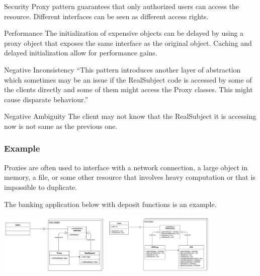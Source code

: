 \begin{nfps}
\item[Security] Proxy pattern guarantees that only authorized users can access
    the resource. Different interfaces can be seen as different access rights.
\item[Performance] The initialization of expensive objects can be delayed by
    using a proxy object that exposes the same interface as the original 
    object. Caching and delayed initialization allow for performance gains.
\item[Negative Inconsistency] ``This pattern introduces another layer of
    abstraction which sometimes may be an issue if the {\sc RealSubject} code
    is accessed by some of the clients directly and some of them might access
    the {\sc Proxy} classes. This might cause disparate behaviour.'' 
\item[Negative Ambiguity] The client may not know that the {\sc RealSubject} it
    is accessing now is not same as the previous one.
\end{nfps}

\subsubsection{Example}
Proxies are often used to interface with a network connection, a large object
in memory, a file, or some other resource that involves heavy computation or
that is impossible to duplicate.

The banking application below with deposit functions is an example.

\begin{center}
    \includegraphics[width=0.4\textwidth]{./proxy1}
    \includegraphics[width=0.4\textwidth]{./proxy2}
\end{center}


